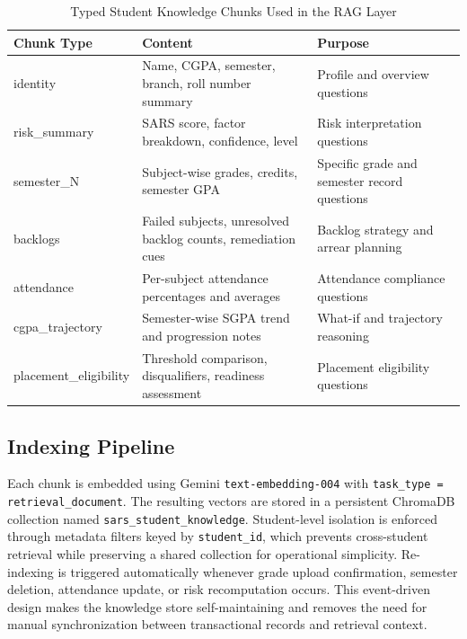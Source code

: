 \documentclass[conference]{IEEEtran}
\begin{document}
\begin{table}[t]
\caption{Typed Student Knowledge Chunks Used in the RAG Layer}
\label{tab:chunks}
\centering
\begin{tabular}{lll}
\toprule
Chunk Type & Content & Purpose \\
\midrule
identity & Name, CGPA, semester, branch, roll number summary & Profile and overview questions \\
risk\_summary & SARS score, factor breakdown, confidence, level & Risk interpretation questions \\
semester\_N & Subject-wise grades, credits, semester GPA & Specific grade and semester record questions \\
backlogs & Failed subjects, unresolved backlog counts, remediation cues & Backlog strategy and arrear planning \\
attendance & Per-subject attendance percentages and averages & Attendance compliance questions \\
cgpa\_trajectory & Semester-wise SGPA trend and progression notes & What-if and trajectory reasoning \\
placement\_eligibility & Threshold comparison, disqualifiers, readiness assessment & Placement eligibility questions \\
\bottomrule
\end{tabular}
\end{table}

\subsection{Indexing Pipeline}
Each chunk is embedded using Gemini \texttt{text-embedding-004} with \texttt{task\_type = retrieval\_document}. The resulting vectors are stored in a persistent ChromaDB collection named \texttt{sars\_student\_knowledge}. Student-level isolation is enforced through metadata filters keyed by \texttt{student\_id}, which prevents cross-student retrieval while preserving a shared collection for operational simplicity. Re-indexing is triggered automatically whenever grade upload confirmation, semester deletion, attendance update, or risk recomputation occurs. This event-driven design makes the knowledge store self-maintaining and removes the need for manual synchronization between transactional records and retrieval context.
\end{document}
